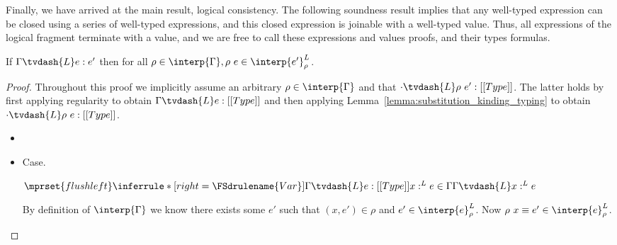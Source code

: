 Finally, we have arrived at the main result, logical consistency.  The
following soundness result implies that any well-typed expression can
be closed using a series of well-typed expressions, and this closed
expression is joinable with a well-typed value.  Thus, all expressions
of the logical fragment terminate with a value, and we are free to
call these expressions and values proofs, and their types formulas.
\begin{thm}
  \label{thm:type_soundness}
  If $\Gamma \tvdash{L} e:e'$ then for all 
  $\rho \in \interp{\Gamma}, \rho\ e \in \interp{e'}^L_\rho$.
\end{thm}
\begin{proof}
  Throughout this proof we implicitly assume an arbitrary $\rho \in \interp{\Gamma}$ and
  that $\cdot \tvdash{L} \rho\ e':[[Type]]$.  The latter holds by first applying regularity to obtain
  $\Gamma \tvdash{L} e:[[Type]]$ and then applying Lemma~\ref{lemma:substitution_kinding_typing} to
  obtain $\cdot \tvdash{L}\rho\ e:[[Type]]$.
  
  \begin{itemize}
  \item[]\ \\
    
  \item[]Case.\ \\
    \begin{center}
      \begin{math}
        $$\mprset{flushleft}
        \inferrule* [right=\FSdrulename{Var}]{
          \Gamma \tvdash{L} e:[[Type]]
          \\\\
          x:^{L} e \in \Gamma
        }{\Gamma \tvdash{L} x:^{L} e}
      \end{math}
    \end{center}
    By definition of $\interp{\Gamma}$ we know there exists some $e'$
    such that $(x,e') \in \rho$ and $e' \in \interp{e}^L_\rho$.
    Now $\rho\ x \equiv e' \in \interp{e}^L_\rho$.
    

\end{itemize}
\end{proof}
